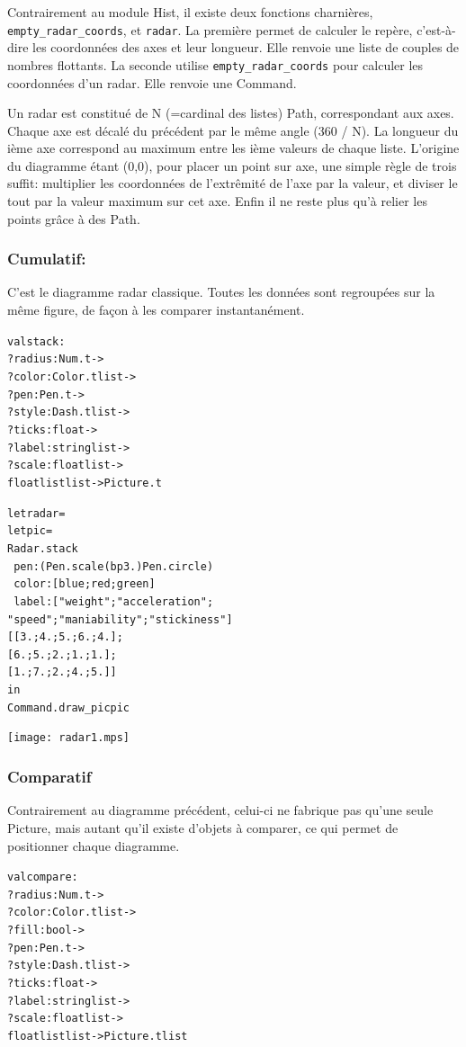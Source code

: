 \documentclass[a4paper,12pt]{article}
\begin{document}
Contrairement au module Hist, il existe deux fonctions charnières, \texttt{empty\_radar\_coords}, et \texttt{radar}.
La première permet de calculer le repère, c'est-à-dire les coordonnées des axes et leur longueur. Elle renvoie une liste de couples de nombres flottants.
La seconde utilise \texttt{empty\_radar\_coords} pour calculer les coordonnées d'un radar. Elle renvoie une Command.
\bigskip 

Un radar est constitué de N (=cardinal des listes) Path, correspondant aux axes. Chaque axe est décalé du précédent par le même angle (360 / N).
La longueur du ième axe correspond au maximum entre les ième valeurs de chaque liste. L'origine du diagramme étant (0,0), pour placer un point sur axe, une simple règle de trois suffit: multiplier les coordonnées de l'extrêmité de l'axe par la valeur, et diviser le tout par la valeur maximum sur cet axe. Enfin il ne reste plus qu'à relier les points grâce à des Path.

\subsubsection{Cumulatif:}
C'est le diagramme radar classique. Toutes les données sont regroupées sur la même figure, de façon à les comparer instantanément. 
\begin{alltt}
  val stack :
  ?radius:Num.t ->
  ?color:Color.t list ->
  ?pen:Pen.t ->
  ?style:Dash.t list ->
  ?ticks:float ->
  ?label:string list ->
  ?scale:float list ->
  float list list -> Picture.t
\end{alltt}

\bigskip

\begin{minipage}{0.5\linewidth}
  \begin{alltt}
    let radar =
    let pic =
    Radar.stack
    ~pen:(Pen.scale (bp 3.) Pen.circle)
    ~color:[blue;red;green]
    ~label:["weight";"acceleration";
      "speed";"maniability";"stickiness"]
    [[3.;4.;5.;6.;4.];
      [6.;5.;2.;1.;1.];
      [1.;7.;2.;4.;5.]]
    in
    Command.draw_pic pic
  \end{alltt}
\end{minipage}
\begin{minipage}{0.5\linewidth}
\begin{center}
\texttt{[image: radar1.mps]}
\end{center}
\end{minipage}

\subsubsection{Comparatif}
Contrairement au diagramme précédent, celui-ci ne fabrique pas qu'une seule Picture, mais autant qu'il existe d'objets à comparer, ce qui permet de positionner chaque diagramme.
\begin{alltt}
 val compare :
 ?radius:Num.t ->
 ?color:Color.t list ->
 ?fill:bool ->
 ?pen:Pen.t ->
 ?style:Dash.t list ->
 ?ticks:float ->
 ?label:string list ->
 ?scale:float list ->
 float list list -> Picture.t list
\end{alltt}
\end{document}
